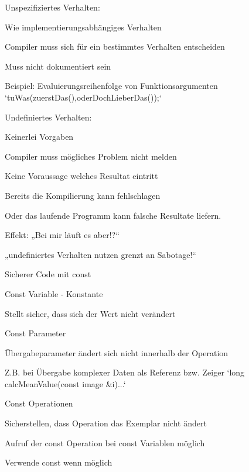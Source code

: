 \documentclass[a4paper]{article}
\begin{document}
\begin{multicols}{3}
  \begin{itemize*}
    \item Unspezifiziertes Verhalten:
    \item Wie implementierungsabhängiges Verhalten
    \item Compiler muss sich für ein bestimmtes Verhalten entscheiden
    \item Muss nicht dokumentiert sein
    \item Beispiel: Evaluierungsreihenfolge von Funktionsargumenten `tuWas(zuerstDas(),oderDochLieberDas());`
    \item Undefiniertes Verhalten:
    \item Keinerlei Vorgaben
    \item Compiler muss mögliches Problem nicht melden
    \item Keine Voraussage welches Resultat eintritt
    \item Bereits die Kompilierung kann fehlschlagen
    \item Oder das laufende Programm kann falsche Resultate liefern.
    \item Effekt: „Bei mir läuft es aber!?“
    \item „undefiniertes Verhalten nutzen grenzt an Sabotage!“
  \end{itemize*}

  Sicherer Code mit const
  \begin{itemize*}
    \item Const Variable - Konstante
    \begin{itemize*}
      \item Stellt sicher, dass sich der Wert nicht verändert
    \end{itemize*}
    \item Const Parameter
    \begin{itemize*}
      \item Übergabeparameter ändert sich nicht innerhalb der Operation
      \item Z.B. bei Übergabe komplexer Daten als Referenz bzw. Zeiger `long calcMeanValue(const image \&i){...}`
    \end{itemize*}
    \item Const Operationen
    \begin{itemize*}
      \item Sicherstellen, dass Operation das Exemplar nicht ändert
      \item Aufruf der const Operation bei const Variablen möglich
    \end{itemize*}
    \item Verwende const wenn möglich
  \end{itemize*}



\end{multicols}
\end{document}
